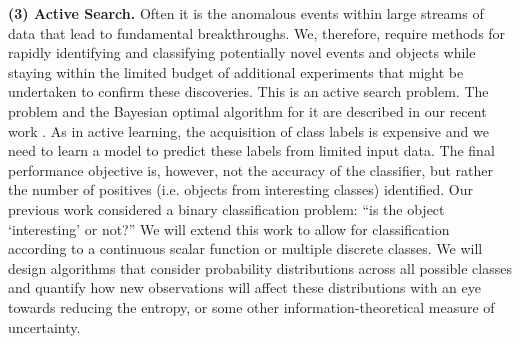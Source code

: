 \documentclass[useAMS,usenatbib,tightenlines,11pt,preprint]{aastex}
\begin{document}
{\bf (3) Active Search.} Often it is the anomalous events within large
streams of data that lead to fundamental breakthroughs. We, therefore, require
methods for
rapidly identifying and classifying potentially novel events and objects
while staying within the limited budget of additional experiments that
might be undertaken to confirm these discoveries.
This is an active search problem. The
problem and the Bayesian optimal algorithm for it are described in our
recent work \cite{Garnett11,Garnett12}.  As in active learning, the
acquisition of class labels is expensive and we need to learn a model to
predict these labels from limited input data. The final
performance objective is, however, not the accuracy of the classifier, but rather the
number of positives (i.e. objects from interesting classes)
identified. Our previous work considered a binary classification problem: ``is
the object `interesting' or not?''  We will extend this work to allow for
classification according to a continuous scalar function or multiple discrete
classes.  We will design algorithms that consider probability distributions
across all possible classes and
quantify how new observations will affect these
distributions with an eye towards reducing the entropy, or some other
information-theoretical measure of uncertainty.





\end{document}

